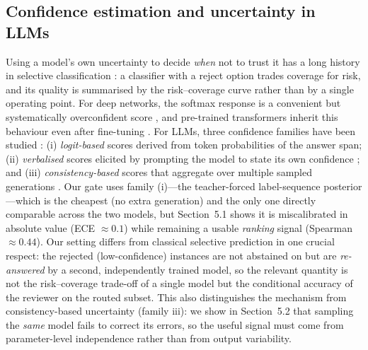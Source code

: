 \documentclass[final,5p,times,twocolumn]{elsarticle}
\begin{document}
\subsection{Confidence estimation and uncertainty in LLMs}
\label{sec:confidence}
Using a model's own uncertainty to decide \emph{when} not to trust it has a
long history in selective classification
\citep{el2010foundations,geifman2017selective,hendrickx2021machine}: a
classifier with a reject option trades coverage for risk, and its quality is
summarised by the risk--coverage curve rather than by a single operating
point. For deep networks, the softmax response is a convenient but
systematically overconfident score \citep{guo2017calibration}, and
pre-trained transformers inherit this behaviour even after fine-tuning
\citep{desai2020calibration}. For LLMs, three confidence families have been
studied \citep{geng2024survey,varshney2022trustworthy}: (i) \emph{logit-based} scores derived from
token probabilities of the answer span; (ii) \emph{verbalised} scores
elicited by prompting the model to state its own confidence
\citep{lin2022teaching,tian2023just,xiong2024can}; and (iii)
\emph{consistency-based} scores that aggregate over multiple sampled
generations \citep{wang2023selfconsistency,kadavath2022lms}. Our gate uses
family (i)---the teacher-forced label-sequence posterior---which is the
cheapest (no extra generation) and the only one directly comparable across
the two models, but Section~5.1 shows it is miscalibrated in absolute value
(ECE $\approx0.1$) while remaining a usable \emph{ranking} signal
(Spearman $\approx0.44$). Our setting differs from classical selective
prediction in one crucial respect: the rejected (low-confidence) instances
are not abstained on but are \emph{re-answered} by a second, independently
trained model, so the relevant quantity is not the risk--coverage trade-off
of a single model but the conditional accuracy of the reviewer on the
routed subset. This also distinguishes the mechanism from
consistency-based uncertainty (family iii): we show in Section~5.2 that
sampling the \emph{same} model fails to correct its errors, so the useful
signal must come from parameter-level independence rather than from output
variability.
\end{document}
